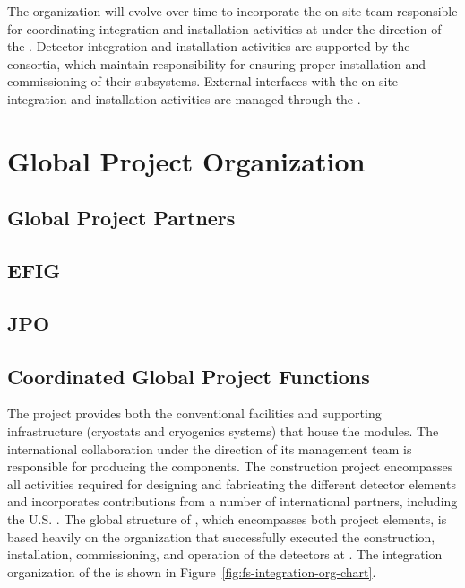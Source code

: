 The  organization will evolve over time to incorporate the 
on-site team responsible for coordinating integration and installation 
activities at  under the direction of the .  
Detector integration and installation activities are supported by the 
 consortia, which maintain responsibility for ensuring 
proper installation and commissioning of their subsystems.  External 
 interfaces with the on-site integration and installation 
activities are managed through the .

\section{Global Project Organization}
\label{sec:exec-tc-partners}

\subsection{Global Project Partners}
\subsection{EFIG}
\subsection{JPO}
\subsection{Coordinated Global Project Functions}

The  project provides both the 
conventional facilities and supporting infrastructure (cryostats 
and cryogenics systems) that house the   
modules.  
The international  
collaboration under the direction of its management team is 
responsible for producing the  components.  The 
  construction project encompasses all 
activities required for designing and fabricating the different 
detector elements and incorporates contributions from a number 
of international partners, including the U.S. .  
The global structure of , which encompasses 
both project elements, is based heavily on 
the organization that successfully executed the construction,
installation, commissioning, and operation of the 
detectors at . 
The 
 integration organization of the  is shown in Figure~\ref{fig:fs-integration-org-chart}. 

